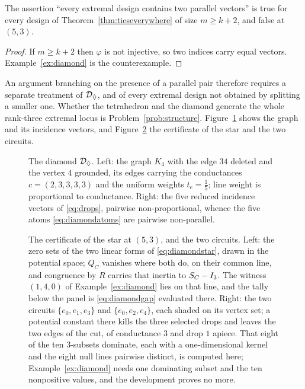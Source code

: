 \begin{corollary}[Lean]\label{cor:noparallel}
The assertion ``every extremal design contains two parallel vectors'' is
true for every design of Theorem~\ref{thm:tieseverywhere} of size
$m\ge k+2$, and false at $(5,3)$.
\end{corollary}

\begin{proof}
If $m\ge k+2$ then $\varphi$ is not injective, so two indices carry equal
vectors.  Example~\ref{ex:diamond} is the counterexample.
\end{proof}

An argument branching on the presence of a parallel pair therefore
requires a separate treatment of $\mathcal{D}_{\Diamond}$, and of every extremal
design not obtained by splitting a smaller one.  Whether the tetrahedron
and the diamond generate the whole rank-three extremal locus is
Problem~\ref{prob:structure}.  Figure~\ref{fig:diamond} shows the graph
and its incidence vectors, and Figure~\ref{fig:diamondcert} the certificate of
the star and the two circuits.

\begin{figure}[ht]
  \centering
  
  \caption{The diamond $\mathcal{D}_{\Diamond}$.  Left: the graph $K_4$ with the edge
  $34$ deleted and the vertex $4$ grounded, its edges carrying the
  conductances $c=(2,3,3,3,3)$ and the uniform weights $t_e=\tfrac15$;
  line weight is proportional to conductance.  Right: the five reduced
  incidence vectors of \eqref{eq:drops}, pairwise non-proportional, whence
  the five atoms \eqref{eq:diamondatoms} are pairwise non-parallel.}
  \label{fig:diamond}
\end{figure}

\begin{figure}[ht]
  \centering
  
  \caption{The certificate of the star at $(5,3)$, and the two circuits.  Left:
  the zero sets of the two linear forms of \eqref{eq:diamondstar}, drawn in the
  potential space; $Q_C$ vanishes where both do, on their common line, and
  congruence by $R$ carries that inertia to $S_{C}-I_3$.  The witness $(1,4,0)$
  of Example~\ref{ex:diamond} lies on that line, and the tally below the panel
  is \eqref{eq:diamondgap} evaluated there.  Right: the two circuits
  $\{e_0,e_1,e_3\}$ and $\{e_0,e_2,e_4\}$, each shaded on its vertex set; a
  potential constant there kills the three selected drops and leaves the two
  edges of the cut, of conductance $3$ and drop $1$ apiece.  That eight of the
  ten $3$-subsets dominate, each with a one-dimensional kernel and the eight
  null lines pairwise distinct, is computed here; Example~\ref{ex:diamond}
  needs one dominating subset and the ten nonpositive values, and the
  development proves no more.}
  \label{fig:diamondcert}
\end{figure}


